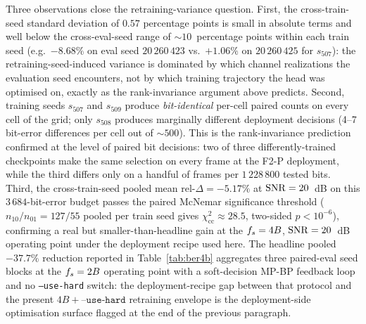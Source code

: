 Three observations close the retraining-variance question. First, the cross-train-seed standard deviation of $0.57$ percentage points is small in absolute terms and well below the cross-eval-seed range of $\sim 10$~percentage points within each train seed (e.g.\ $-8.68\%$ on eval seed $20\,260\,423$ vs.\ $+1.06\%$ on $20\,260\,425$ for $s_{507}$): the retraining-seed-induced variance is dominated by which channel realizations the evaluation seed encounters, not by which training trajectory the head was optimised on, exactly as the rank-invariance argument above predicts. Second, training seeds $s_{507}$ and $s_{509}$ produce \emph{bit-identical} per-cell paired counts on every cell of the grid; only $s_{508}$ produces marginally different deployment decisions (4--7 bit-error differences per cell out of $\sim 500$). This is the rank-invariance prediction confirmed at the level of paired bit decisions: two of three differently-trained checkpoints make the same selection on every frame at the F2-P deployment, while the third differs only on a handful of frames per $1\,228\,800$ tested bits. Third, the cross-train-seed pooled mean rel-$\Delta = -5.17\%$ at $\mathrm{SNR} = 20$~dB on this $3\,684$-bit-error budget passes the paired McNemar significance threshold ($n_{10}/n_{01} = 127/55$ pooled per train seed gives $\chi^2_\text{cc} \approx 28.5$, two-sided $p < 10^{-6}$), confirming a real but smaller-than-headline gain at the $f_s = 4B$, $\mathrm{SNR} = 20$~dB operating point under the deployment recipe used here. The headline pooled $-37.7\%$ reduction reported in Table~\ref{tab:ber4b} aggregates three paired-eval seed blocks at the $f_s = 2B$ operating point with a soft-decision MP-BP feedback loop and no \texttt{--use-hard} switch: the deployment-recipe gap between that protocol and the present $4B + \texttt{--use-hard}$ retraining envelope is the deployment-side optimisation surface flagged at the end of the previous paragraph.

